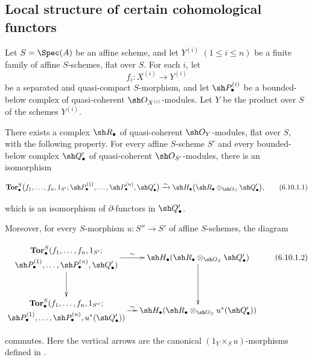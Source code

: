 \subsection{Local structure of certain cohomological functors}
\label{subsection:III.6.10}
\label{III.6.10}


\begin{proposition}[6.10.1]
\label{III.6.10.1}
Let $S=\Spec(A)$ be an affine scheme, and let
$Y^{(i)}$ $(1\leq i\leq n)$ be a finite family of affine
$S$-schemes, flat over $S$.  For each $i$, let
\[
  f_i:X^{(i)}\longrightarrow Y^{(i)}
\]
be a separated and quasi-compact $S$-morphism, and let
$\sh P_\bullet^{(i)}$ be a bounded-below complex of
quasi-coherent $\sh O_{X^{(i)}}$-modules.  Let $Y$ be the product
over $S$ of the schemes $Y^{(i)}$.

There exists a complex $\sh R_\bullet$ of quasi-coherent
$\sh O_Y$-modules, flat over $S$, with the following property.
For every affine $S$-scheme $S'$ and every bounded-below complex
$\sh Q_\bullet'$ of quasi-coherent $\sh O_{S'}$-modules, there is
an isomorphism
\begin{env}[6.10.1.1]
\label{III.6.10.1.1}
\[
  \mathbf{Tor}_\bullet^S
  \bigl(
    f_1,\ldots,f_n,1_{S'};
    \sh P_\bullet^{(1)},\ldots,\sh P_\bullet^{(n)},
    \sh Q_\bullet'
  \bigr)
  \xrightarrow{\sim}
  \sh H_\bullet
  \bigl(
    \sh R_\bullet\otimes_{\sh O_S}\sh Q_\bullet'
  \bigr),
  \tag{6.10.1.1}\label{III.6.10.1.1.eq}
\]
\end{env}
which is an isomorphism of $\partial$-functors in
$\sh Q_\bullet'$.

Moreover, for every $S$-morphism
$u:S''\to S'$ of affine $S$-schemes, the diagram
\begin{env}[6.10.1.2]
\label{III.6.10.1.2}
\[
\xymatrix@C=12pt@R=30pt{
  {\begin{gathered}
    \mathbf{Tor}_\bullet^S
    (f_1,\ldots,f_n,1_{S'};\\
    \sh P_\bullet^{(1)},\ldots,\sh P_\bullet^{(n)},
    \sh Q_\bullet')
  \end{gathered}}
  \ar[r]^-{\sim}\ar[d]
  &
  {\sh H_\bullet
    (\sh R_\bullet\otimes_{\sh O_S}\sh Q_\bullet')}
  \ar[d]
  \\
  {\begin{gathered}
    \mathbf{Tor}_\bullet^S
    (f_1,\ldots,f_n,1_{S''};\\
    \sh P_\bullet^{(1)},\ldots,\sh P_\bullet^{(n)},
    u^*(\sh Q_\bullet'))
  \end{gathered}}
  \ar[r]^-{\sim}
  &
  {\sh H_\bullet
    (\sh R_\bullet\otimes_{\sh O_S}u^*(\sh Q_\bullet'))}
}
\tag{6.10.1.2}\label{III.6.10.1.2.eq}
\]
\end{env}
commutes.  Here the vertical arrows are the canonical
$(1_Y\times_Su)$-morphisms defined in .
\end{proposition}

